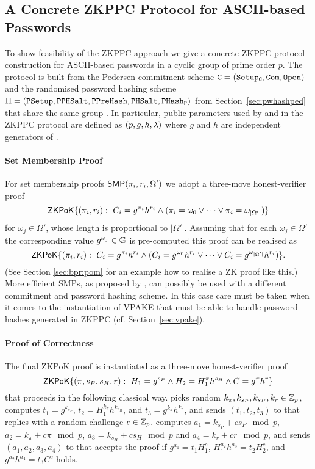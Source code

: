 \subsection{A Concrete ZKPPC Protocol for ASCII-based Passwords}\label{sec:instantiation}
To show feasibility of the \ac{ZKPPC} approach we give a concrete \ac{ZKPPC} protocol construction for \ac{ASCII}-based passwords in a cyclic group \GG of prime order $p$. 
The protocol is built from the Pedersen commitment scheme $\mathtt{C}=(\mathtt{Setup_C},\mathtt{Com},\mathtt{Open})$ and the randomised password hashing scheme $\Pi=(\mathtt{PSetup},\allowbreak\mathtt{PPHSalt},\allowbreak\mathtt{PPreHash},\mathtt{PHSalt},\allowbreak\mathtt{PHash_P})$ from Section~\ref{sec:pwhashped} that share the same group \GG. 
In particular, public parameters used by \Client and \Server in the \ac{ZKPPC} protocol are defined as $(p,g,h,\lambda)$ where $g$ and $h$ are independent generators of \GG. 

\paragraph{Set Membership Proof}
For set membership proofs $\mathsf{SMP}(\pi_i,r_i,\Omega')$ we adopt a three-move honest-verifier proof 
\[\mathsf{ZKPoK}\{(\pi_i,r_i):~ C_i=g^{\pi_i}h^{r_i} \wedge (\pi_i=\omega_0 \vee \dots \vee \pi_i=\omega_{|\Omega'|})\}\]
for $\omega_j\in\Omega'$, whose length is proportional to $|\Omega'|$. 
Assuming that for each $\omega_j\in\Omega'$ the corresponding value $g^{\omega_j}\in \mathbb{G}$ is pre-computed this proof can be realised as 
\[\mathsf{ZKPoK}\{(\pi_i,r_i):~ C_i=g^{\pi_i}h^{r_i} \wedge (C_i=g^{\omega_0}h^{r_i} \vee \dots \vee C_i=g^{\omega_{|\Omega'|}}h^{r_i})\}.\]
(See Section \ref{sec:bpr:pom} for an example how to realise a \ac{ZK} proof like this.)
More efficient \acp{SMP}, \eg as proposed by \citet{CamenischCS08}, can possibly be used with a different commitment and password hashing scheme. 
In this case care must be taken when it comes to the instantiation of \ac{VPAKE} that must be able to handle password hashes generated in \ac{ZKPPC} (cf. Section~\ref{sec:vpake}).


\paragraph{Proof of Correctness}
The final \ac{ZKPoK} proof is instantiated as a three-move honest-verifier proof 
\[\mathsf{ZKPoK}\{(\pi, s_P, s_H, r):~ H_1=g^{s_P} \wedge H_2 = H_1^{\pi}h^{s_H} \wedge C = g^\pi h^{r}\}\] 
that proceeds in the following classical way. 
\Client picks random $k_\pi, k_{s_P}, k_{s_H}, k_{r}\in\mathbb{Z}_p$, computes $t_1=g^{k_{s_P}}$, $t_2=H_1^{k_\pi}h^{k_{s_H}}$, and $t_3=g^{k_\pi}h^{k_{r}}$, and sends $(t_1,t_2,t_3)$ to \Server that replies with a random challenge $c\in\mathbb{Z}_p$. 
\Client computes $a_1=k_{s_P}+cs_P\mod p$, $a_2=k_\pi+c\pi \mod p$, $a_3=k_{s_H}+cs_{H}\mod p$ and $a_4=k_{r}+cr\mod p$, and sends $(a_1,a_2,a_3,a_4)$ to \Server that accepts the proof if $g^{a_1}=t_1 H_1^{c}$, $H_1^{a_2}h^{a_3}=t_2H_2^c$, and $g^{a_2}h^{a_4}=t_3C^c$ holds.

